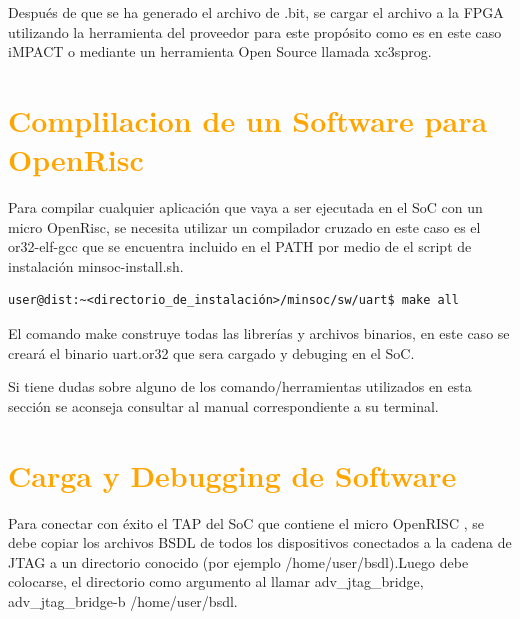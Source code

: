 Después de que se ha generado el archivo de .bit, se cargar el archivo a la FPGA utilizando la herramienta del proveedor para este propósito como es en este caso iMPACT o mediante un herramienta Open Source llamada xc3sprog. 

\section{\textcolor{orange}{Complilacion de un Software para OpenRisc}}

Para compilar cualquier aplicación que vaya a ser ejecutada en el SoC con un micro OpenRisc, se necesita utilizar un compilador cruzado en este caso es el or32-elf-gcc que se encuentra incluido en el PATH por medio de el script de instalación minsoc-install.sh.

\begin{lstlisting}[breaklines]
user@dist:~<directorio_de_instalación>/minsoc/sw/uart$ make all
\end{lstlisting}
 
El comando make construye todas las librerías y archivos binarios, en este caso se creará el binario uart.or32 que sera cargado y debuging en el SoC.
 

Si tiene dudas sobre alguno de los comando/herramientas utilizados en esta sección se aconseja consultar al manual correspondiente a su terminal.


\section{\textcolor{orange}{Carga y Debugging de Software}}


Para conectar con éxito el TAP del SoC que contiene el micro OpenRISC , se debe copiar los archivos BSDL de todos los dispositivos conectados a la cadena de JTAG a un directorio conocido (por ejemplo /home/user/bsdl).Luego debe colocarse, el directorio como argumento al llamar adv\_jtag\_bridge, adv\_jtag\_bridge-b /home/user/bsdl.

